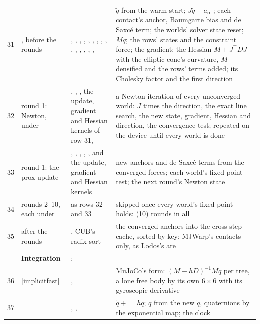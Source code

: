 \begin{longtable}{@{}L{4mm}L{27mm}L{54mm}L{63mm}@{}}
31 & , before the rounds & , , , , , , , , , , , , , , ,  & $\ddot q$ from the warm start; $J\ddot q - a_\mathrm{ref}$; each contact's anchor, Baumgarte bias and de Saxcé term; the worlds' solver state reset; $M\ddot q$; the rows' states and the constraint force; the gradient; the Hessian $M + J^\top D J$ with the elliptic cone's curvature, $M$ densified and the rows' terms added; its Cholesky factor and the first direction \\
32 & round 1: Newton, under  & , , , the update, gradient and Hessian kernels of row 31,  & a Newton iteration of every unconverged world: $J$ times the direction, the exact line search, the new state, gradient, Hessian and direction, the convergence test; repeated on the device until every world is done \\
33 & round 1: the prox update & , , , , , and the update, gradient and Hessian kernels & new anchors and de Saxcé terms from the converged forces; each world's fixed-point test; the next round's Newton state \\
34 & rounds 2--10, each under  & as rows 32 and 33 & skipped once every world's fixed point holds:  (10) rounds in all \\
35 & after the rounds & , CUB's radix sort & the converged anchors into the cross-step cache, sorted by key: MJWarp's contacts only, as Lodos's are  \\
& \textbf{Integration} & :  & \\
36 & [implicitfast]  & ,  & MuJoCo's form: $(M - hD)^{-1} M \ddot q$ per tree, a lone free body by its own $6\times6$ with its gyroscopic derivative \\
37 &  & , ,  & $\dot q \mathrel{+}= h\ddot q$; $q$ from the new $\dot q$, quaternions by the exponential map; the clock \\
\bottomrule
\end{longtable}
\endgroup

